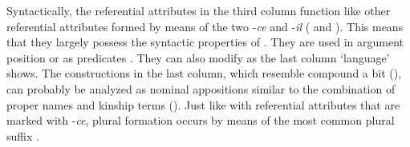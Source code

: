 Syntactically, the referential attributes in the third column function like other referential attributes formed by means of the two  -\textit{ce} and -\textit{il} ( and ). This means that they largely possess the syntactic properties of . They are used in argument position  or as predicates . They can also modify  as the last column `language' shows. The constructions in the last column, which resemble compound  a bit (), can probably be analyzed as nominal appositions similar to the combination of proper names and kinship terms (). Just like with referential attributes that are marked with -\textit{ce}, plural formation occurs by means of the most common plural suffix  . 

